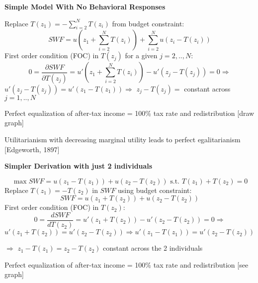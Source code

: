 \documentclass[landscape]{slides}
\begin{document}
\begin{slide}
\begin{center}
{\bf Simple Model With No Behavioral Responses}
\end{center}
Replace $T(z_1)=- \sum_{i=2}^N T(z_i)$ from budget constraint:
\[ SWF= u \left (z_1 + \sum_{i=2}^N T(z_i)  \right ) +  \sum_{i=2}^N u(z_i-T(z_i)) \]
First order condition (FOC) in $T(z_j)$ for a given $j=2,..,N$:
\[ 0= \frac{\partial SWF}{\partial T(z_j) } = u' \left (z_1 + \sum_{i=2}^N T(z_i)  \right ) 
-u'(z_j-T(z_j))=0 \Rightarrow   \]
$u'(z_j-T(z_j))=u'(z_1-T(z_1))
\Rightarrow$ $z_j-T(z_j)=$ constant across $j=1,..,N$

Perfect equalization of after-tax income = 100\% tax rate and redistribution [draw graph]

Utilitarianism with decreasing marginal utility leads to perfect
egalitarianism [Edgeworth, 1897]

\end{slide}

\begin{slide}
\begin{center}
{\bf Simpler Derivation with just 2 individuals}
\end{center}
\[ \max SWF = u(z_1-T(z_1)) + u(z_2-T(z_2)) \text{ s.t. } T(z_1)+T(z_2)=0 \]
Replace $T(z_1)=- T(z_2)$ in $SWF$ using budget constraint:
\[ SWF= u \left (z_1 + T(z_2)  \right ) +   u(z_2-T(z_2)) \]
First order condition (FOC) in $T(z_2)$:
\[ 0= \frac{d SWF}{d T(z_2) } = u' \left (z_1 + T(z_2)  \right ) 
-u'(z_2-T(z_2))=0 \Rightarrow   \]
$u'(z_1+T(z_2))=u'(z_2-T(z_2)) \Rightarrow u'(z_1-T(z_1))=u'(z_2-T(z_2))$

$\Rightarrow$ $z_1-T(z_1)=z_2-T(z_2)$ constant across the 2 individuals

Perfect equalization of after-tax income = 100\% tax rate and redistribution [see graph]

\end{slide}


\begin{slide}

\end{slide}
\end{document}
